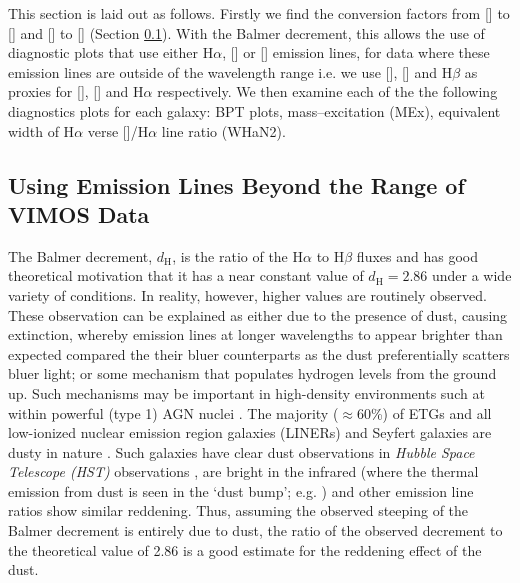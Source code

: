	This section is laid out as follows. Firstly we find the conversion factors from [] to [] and [] to [] (Section \ref{subsec:Ndec}). With the Balmer decrement, this allows the use of diagnostic plots that use either H$\alpha$, [] or [] emission lines, for data where these emission lines are outside of the wavelength range i.e. we use [], [] and H$\beta$ as proxies for [], [] and H$\alpha$ respectively. We then examine each of the the following diagnostics plots for each galaxy: BPT plots, mass--excitation (MEx), equivalent width of H$\alpha$ verse []/H$\alpha$ line ratio (WHaN2).%

	\subsection{Using Emission Lines Beyond the Range of VIMOS Data}
		\label{subsec:Ndec}

		The Balmer decrement, $d_\mathrm{H}$, is the ratio of the H$\alpha$ to H$\beta$ fluxes and has good theoretical motivation that it has a near constant value of $d_\mathrm{H} = 2.86$ under a wide variety of conditions. In reality, however, higher values are routinely observed. These observation can be explained as either due to the presence of dust, causing extinction, whereby emission lines at longer wavelengths to appear brighter than expected compared the their bluer counterparts as the dust preferentially scatters bluer light; or some mechanism that populates hydrogen levels from the ground up. Such mechanisms may be important in high-density environments such at within powerful (type 1) AGN nuclei \citep[e.g.][]{Shields1974, Netzer1975}. The majority ($\approx 60$\%) of ETGs and all low-ionized nuclear emission region galaxies (LINERs) and Seyfert galaxies are dusty in nature \citep[e.g.][]{Martini2013}. Such galaxies have clear dust observations in \textit{Hubble Space Telescope (HST)} observations \citep[e.g.][]{Martini2013}, are bright in the infrared (where the thermal emission from dust is seen in the `dust bump'; e.g. \citealt{Jura1987, Knapp1992}) and other emission line ratios \citep[e.g.  in ][]{Wampler1968} show similar reddening. Thus, assuming the observed steeping of the Balmer decrement is entirely due to dust, the ratio of the observed decrement to the theoretical value of 2.86 is a good estimate for the reddening effect of the dust.

